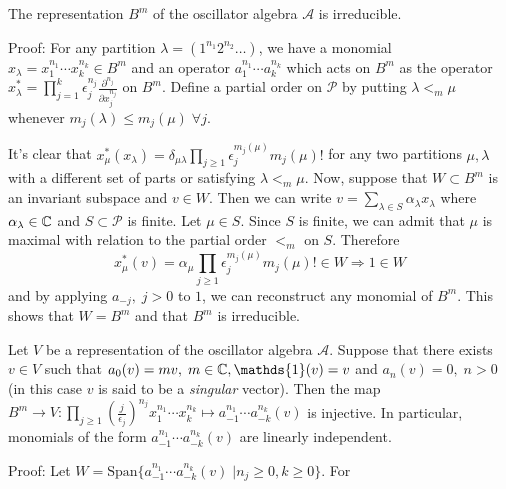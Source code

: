 \begin{dang}
    \begin{theorem}\cite{kac2013bombay}\label{Theorem: Fock space is irreducible}
        The representation $B^m$ of the oscillator algebra $\mathcal{A}$ is irreducible.
    \end{theorem}
\end{dang}
Proof: For any partition $\lambda=(1^{n_1}2^{n_2}\dots)$, we have a monomial $x_\lambda = x_1^{n_1}\cdots x_k^{n_k}\in B^m$ and an operator $a_1^{n_1}\cdots a_k^{n_k}$ which acts on $B^m$ as the operator $x^*_\lambda=\prod_{j=1}^k\epsilon_j^{n_j} \frac{\partial^{n_j}}{\partial x_j^{n_j}}$ on $B^m$. Define a partial order on $\mathcal{P}$ by putting $\lambda<_m\mu$ whenever $m_j(\lambda)\leq m_j(\mu)\;\forall j$.\par
It's clear that $x^*_\mu(x_\lambda)=\delta_{\mu\lambda}\prod_{j\geq1}\epsilon_j^{m_j(\mu)}m_j(\mu)!$ for any two partitions $\mu,\lambda$ with a different set of parts or satisfying $\lambda<_m\mu$. Now, suppose that $W\subset B^m$ is an invariant subspace and $v\in W$. Then we can write $v=\sum_{\lambda\in S}\alpha_\lambda x_\lambda$ where $\alpha_\lambda\in\mathbb{C}$ and $S\subset\mathcal{P}$ is finite. Let $\mu\in S$. Since $S$ is finite, we can admit that $\mu$ is maximal with relation to the partial order $<_m$ on $S$. Therefore
\begin{equation}
    x_\mu^*(v)=\alpha_\mu\prod_{j\geq1}\epsilon_j^{m_j(\mu)}m_j(\mu)! \in W\Rightarrow
    1\in W
\end{equation}
and by applying $a_{-j},\; j>0$ to $1$, we can reconstruct any monomial of $B^m$. This shows that $W=B^m$ and that $B^m$ is irreducible.
\begin{dang}
    \begin{theorem}\cite{kac2013bombay}\label{Theorem: Characterizaton of reps of the oscillator algebra with singular vectors}
        Let $V$ be a representation of the oscillator algebra $\mathcal{A}$. Suppose that there exists $v\in V$ such that $a_0(v)=m v,\;m\in\bb{C},\mathds{1}(v)=v$ and $a_n(v)=0,\;n>0$ (in this case $v$ is said to be a \textit{singular} vector). Then the map $B^m\rightarrow V:\prod_{j\geq1}\left(\frac{j}{\epsilon_j}\right)^{n_j} x_1^{n_1}\cdots x_k^{n_k}\mapsto a_{-1}^{n_1}\cdots a_{-k}^{n_k}(v)$ is injective. In particular, monomials of the form $a_{-1}^{n_1}\cdots a_{-k}^{n_k}(v)$ are linearly independent.
    \end{theorem}
\end{dang}
Proof: Let $W=\text{Span}\{a_{-1}^{n_1}\cdots a_{-k}^{n_k}(v)\;|n_j\geq0,k\geq0\}$. For 
